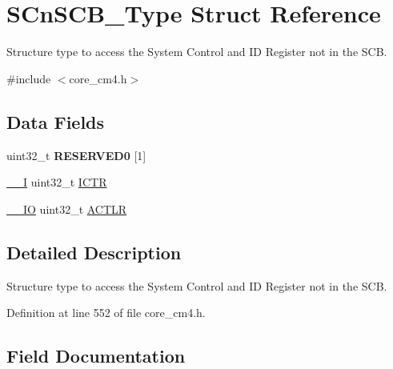 \hypertarget{struct_s_cn_s_c_b___type}{}\section{S\+Cn\+S\+C\+B\+\_\+\+Type Struct Reference}
\label{struct_s_cn_s_c_b___type}


Structure type to access the System Control and ID Register not in the S\+CB.  




{\ttfamily \#include $<$core\+\_\+cm4.\+h$>$}

\subsection*{Data Fields}
\begin{DoxyCompactItemize}
\item 
\mbox{\label{struct_s_cn_s_c_b___type_a40626516c1871e2cb75ae9d5940a9341}} 
uint32\+\_\+t {\bfseries R\+E\+S\+E\+R\+V\+E\+D0} \mbox{[}1\mbox{]}
\item 
\hyperlink{group___c_m_s_i_s__core__definitions_gaf63697ed9952cc71e1225efe205f6cd3}{\+\_\+\+\_\+I} uint32\+\_\+t \hyperlink{struct_s_cn_s_c_b___type_a5bb2c6795b90f12077534825cc844b56}{I\+C\+TR}
\item 
\hyperlink{group___c_m_s_i_s__core__definitions_gaec43007d9998a0a0e01faede4133d6be}{\+\_\+\+\_\+\+IO} uint32\+\_\+t \hyperlink{struct_s_cn_s_c_b___type_a9a73f00a0223775caeb09c5c6abb3087}{A\+C\+T\+LR}
\end{DoxyCompactItemize}


\subsection{Detailed Description}
Structure type to access the System Control and ID Register not in the S\+CB. 

Definition at line 552 of file core\+\_\+cm4.\+h.



\subsection{Field Documentation}
\mbox{\label{struct_s_cn_s_c_b___type_a9a73f00a0223775caeb09c5c6abb3087}} 
